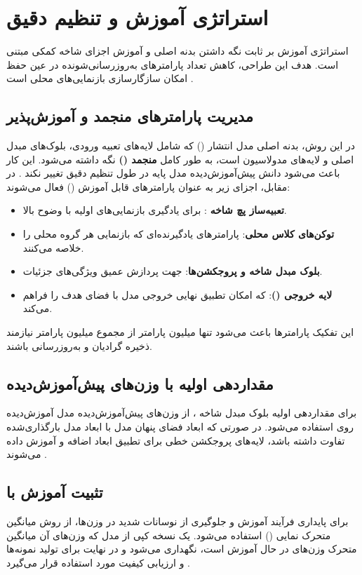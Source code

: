 \section{استراتژی آموزش و تنظیم دقیق}
استراتژی آموزش  بر ثابت نگه داشتن بدنه اصلی و آموزش اجزای شاخه کمکی مبتنی است. هدف این طراحی، کاهش تعداد پارامترهای به‌روزرسانی‌شونده در عین حفظ امکان سازگارسازی بازنمایی‌های محلی است \cite{8409325,2212.09748}.

\subsection{مدیریت پارامترهای منجمد و آموزش‌پذیر}
در این روش، بدنه اصلی مدل انتشار () که شامل لایه‌های تعبیه ورودی، بلوک‌های مبدل اصلی و لایه‌های مدولاسیون است، به طور کامل \textbf{منجمد ()} نگه داشته می‌شود. این کار باعث می‌شود دانش پیش‌آموزش‌دیده مدل پایه در طول تنظیم دقیق تغییر نکند \cite{8409325,2212.09748}.
در مقابل، اجزای زیر به عنوان پارامترهای قابل آموزش () فعال می‌شوند:
\begin{itemize}
    \item \textbf{تعبیه‌ساز پچ شاخه }: برای یادگیری بازنمایی‌های اولیه با وضوح بالا.
    \item \textbf{توکن‌های کلاس محلی}: پارامترهای یادگیرنده‌ای که بازنمایی هر گروه محلی را خلاصه می‌کنند.
    \item \textbf{بلوک مبدل شاخه  و پروجکشن‌ها}: جهت پردازش عمیق ویژگی‌های جزئیات.
    \item \textbf{لایه خروجی ()}: که امکان تطبیق نهایی خروجی مدل با فضای هدف را فراهم می‌کند.
\end{itemize}
این تفکیک پارامترها باعث می‌شود تنها  میلیون پارامتر از مجموع  میلیون پارامتر نیازمند ذخیره گرادیان و به‌روزرسانی باشند.

\subsection{مقداردهی اولیه با وزن‌های پیش‌آموزش‌دیده}
برای مقداردهی اولیه بلوک مبدل شاخه ، از وزن‌های پیش‌آموزش‌دیده مدل  آموزش‌دیده روی  استفاده می‌شود. در صورتی که ابعاد فضای پنهان مدل  با ابعاد مدل  بارگذاری‌شده تفاوت داشته باشد، لایه‌های پروجکشن خطی برای تطبیق ابعاد اضافه و آموزش داده می‌شوند \cite{Dosovitskiy2020,5206848,wightman2019timm,2212.09748}.

\subsection{تثبیت آموزش با }
برای پایداری فرآیند آموزش و جلوگیری از نوسانات شدید در وزن‌ها، از روش میانگین متحرک نمایی () استفاده می‌شود. یک نسخه کپی از مدل که وزن‌های آن میانگین متحرک وزن‌های در حال آموزش است، نگهداری می‌شود و در نهایت برای تولید نمونه‌ها و ارزیابی کیفیت مورد استفاده قرار می‌گیرد \cite{2212.09748}.

